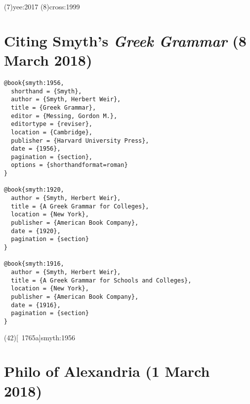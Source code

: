 \documentclass[a4paper]{article}
\begin{document}
\examplecite(7){yee:2017}
\examplecite(8){cross:1999}
\exampleabbreviations
\examplebibliography
{}

\section{Citing Smyth's \emph{Greek Grammar} (8 March 2018)}

\begin{verbatim}
@book{smyth:1956,
  shorthand = {Smyth},
  author = {Smyth, Herbert Weir},
  title = {Greek Grammar},
  editor = {Messing, Gordon M.},
  editortype = {reviser},
  location = {Cambridge},
  publisher = {Harvard University Press},
  date = {1956},
  pagination = {section},
  options = {shorthandformat=roman}
}

@book{smyth:1920,
  author = {Smyth, Herbert Weir},
  title = {A Greek Grammar for Colleges},
  location = {New York},
  publisher = {American Book Company},
  date = {1920},
  pagination = {section}
}

@book{smyth:1916,
  author = {Smyth, Herbert Weir},
  title = {A Greek Grammar for Schools and Colleges},
  location = {New York},
  publisher = {American Book Company},
  date = {1916},
  pagination = {section}
}
\end{verbatim}

\examplecite(42)[\pno 1765a]{smyth:1956}
\begin{verbcite}
  \nocite{smyth:1920, smyth:1916}
\end{verbcite}
\exampleabbreviations
\examplebibliography
{}

\section{Philo of Alexandria (1 March 2018)}
\end{document}
